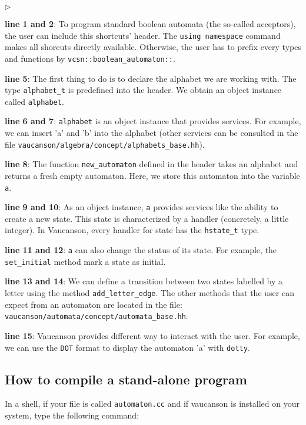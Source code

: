 \documentclass{article}
\begin{document}
\begin{list}{$\triangleright$}{}
\item \textbf{line 1 and 2}: To program standard boolean automata (the
so-called acceptors), the user can include this shortcuts' header. The
\verb!using namespace! command makes all shorcuts directly
available. Otherwise, the user has to prefix every types and functions
by \verb!vcsn::boolean_automaton::!.
\item \textbf{line 5}: The first thing to do is to declare the
alphabet we are working with. The type \verb!alphabet_t! is predefined
into the header. We obtain an object instance called \verb!alphabet!.
\item \textbf{line 6 and 7}: \verb!alphabet! is an object instance
that provides services. For example, we can insert 'a' and 'b' into
the alphabet (other services can be consulted in the file 
\verb!vaucanson/algebra/concept/alphabets_base.hh!).
\item \textbf{line 8}: The function \verb!new_automaton! defined in
the header takes an alphabet and returns a fresh empty automaton. Here,
we store this automaton into the variable \verb!a!.
\item \textbf{line 9 and 10}: As an object instance, \verb!a! provides
services like the ability to create a new state. This state is
characterized by a handler (concretely, a little integer). In Vaucanson,
every handler for state has the \verb!hstate_t! type. 
\item \textbf{line 11 and 12}: \verb!a! can also change the status of
its state. For example, the \verb!set_initial! method mark a state as
initial. 
\item \textbf{line 13 and 14}: We can define a transition between two
states labelled by a letter using the method \verb!add_letter_edge!.
The other methods that the user can expect from an automaton are located in
the file: \verb!vaucanson/automata/concept/automata_base.hh!.
\item \textbf{line 15}: Vaucanson provides different way to interact
with the user. For example, we can use the \verb!DOT! format to
display the automaton 'a' with \verb!dotty!.
\end{list}

\subsection{How to compile a stand-alone program}

In a shell, if your file is called \verb!automaton.cc! and
if vaucanson is installed on your system,
type the following command:
\end{document}
